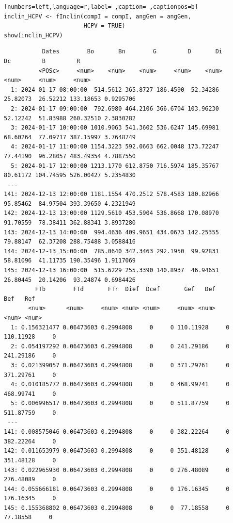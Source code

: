 \begin{itemize}
\begin{lstlisting}[numbers=left,language=r,label= ,caption= ,captionpos=b]
inclin_HCPV <- fInclin(compI = compI, angGen = angGen,
                       HCPV = TRUE)
show(inclin_HCPV)
\end{lstlisting}

\begin{verbatim}
		   Dates        Bo       Bn        G         D       Di        Dc         B         R
		  <POSc>     <num>    <num>    <num>     <num>    <num>     <num>     <num>     <num>
  1: 2024-01-17 08:00:00  514.5612 365.8727 186.4590  52.34286 25.82073  26.52212 133.18653 0.9295706
  2: 2024-01-17 09:00:00  792.6980 464.2106 366.6704 103.96230 52.12242  51.83988 260.32510 2.3830282
  3: 2024-01-17 10:00:00 1010.9063 541.3602 536.6247 145.69981 68.60264  77.09717 387.15997 3.7648749
  4: 2024-01-17 11:00:00 1154.3223 592.0663 662.0048 173.72247 77.44190  96.28057 483.49354 4.7887550
  5: 2024-01-17 12:00:00 1213.1770 612.8750 716.5974 185.35767 80.61172 104.74595 526.00427 5.2354830
 ---                                                                                                 
141: 2024-12-13 12:00:00 1181.1554 470.2512 578.4583 180.82966 95.85462  84.97504 393.39650 4.2321949
142: 2024-12-13 13:00:00 1129.5610 453.5904 536.8668 170.08970 91.70559  78.38411 362.88341 3.8937280
143: 2024-12-13 14:00:00  994.4636 409.9651 434.0673 142.25355 79.88147  62.37208 288.75488 3.0588416
144: 2024-12-13 15:00:00  785.0640 342.3463 292.1950  99.92831 58.81096  41.11735 190.35496 1.9117069
145: 2024-12-13 16:00:00  515.6229 255.3390 140.8937  46.94651 26.80445  20.14206  93.24874 0.6984426
	     FTb        FTd       FTr  Dief  Dcef       Gef   Def       Bef   Ref
	   <num>      <num>     <num> <num> <num>     <num> <num>     <num> <num>
  1: 0.156321477 0.06473603 0.2994808     0     0 110.11928     0 110.11928     0
  2: 0.054197292 0.06473603 0.2994808     0     0 241.29186     0 241.29186     0
  3: 0.021399057 0.06473603 0.2994808     0     0 371.29761     0 371.29761     0
  4: 0.010185772 0.06473603 0.2994808     0     0 468.99741     0 468.99741     0
  5: 0.006996517 0.06473603 0.2994808     0     0 511.87759     0 511.87759     0
 ---                                                                             
141: 0.008575046 0.06473603 0.2994808     0     0 382.22264     0 382.22264     0
142: 0.011653979 0.06473603 0.2994808     0     0 351.48128     0 351.48128     0
143: 0.022965930 0.06473603 0.2994808     0     0 276.48089     0 276.48089     0
144: 0.055666181 0.06473603 0.2994808     0     0 176.16345     0 176.16345     0
145: 0.155368802 0.06473603 0.2994808     0     0  77.18558     0  77.18558     0
\end{verbatim}
\end{itemize}

